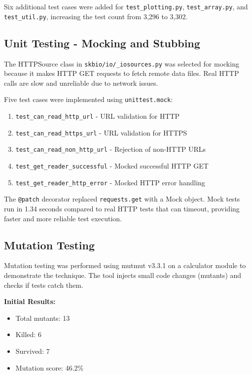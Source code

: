 \documentclass[11pt]{article}
\begin{document}
Six additional test cases were added for \texttt{test\_plotting.py}, \texttt{test\_array.py}, and \texttt{test\_util.py}, increasing the test count from 3,296 to 3,302.

\subsection{Unit Testing - Mocking and Stubbing}

The HTTPSource class in \texttt{skbio/io/\_iosources.py} was selected for mocking because it makes HTTP GET requests to fetch remote data files. Real HTTP calls are slow and unreliable due to network issues.

Five test cases were implemented using \texttt{unittest.mock}:

\begin{enumerate}[noitemsep]
    \item \texttt{test\_can\_read\_http\_url} - URL validation for HTTP
    \item \texttt{test\_can\_read\_https\_url} - URL validation for HTTPS
    \item \texttt{test\_can\_read\_non\_http\_url} - Rejection of non-HTTP URLs
    \item \texttt{test\_get\_reader\_successful} - Mocked successful HTTP GET
    \item \texttt{test\_get\_reader\_http\_error} - Mocked HTTP error handling
\end{enumerate}

The \texttt{@patch} decorator replaced \texttt{requests.get} with a Mock object. Mock tests run in 1.34 seconds compared to real HTTP tests that can timeout, providing faster and more reliable test execution.

\subsection{Mutation Testing}

Mutation testing was performed using mutmut v3.3.1 on a calculator module to demonstrate the technique. The tool injects small code changes (mutants) and checks if tests catch them.

\textbf{Initial Results:}
\begin{itemize}[noitemsep]
    \item Total mutants: 13
    \item Killed: 6
    \item Survived: 7
    \item Mutation score: 46.2\%
\end{itemize}
\end{document}
